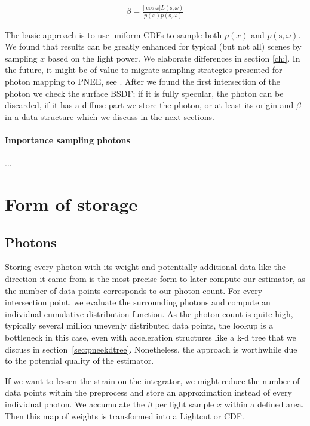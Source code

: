 \begin{align}\label{eq:beta}
\beta = \frac{|\cos{\omega}|L(\text{s}, \omega)}{p(x)p(\text{s}, \omega)}
\end{align}

The basic approach is to use uniform CDFs to sample both $p(x)$ and $p(\text{s}, \omega)$. We found that results can be greatly enhanced for typical (but not all) scenes by sampling $x$ based on the light power. We elaborate differences in section \ref{ch:}. In the future, it might be of value to migrate sampling strategies presented for photon mapping to PNEE, see \cite{DBLP:conf/rt/SuykensW00}. After we found the first intersection of the photon we check the surface BSDF; if it is fully specular, the photon can be discarded, if it has a diffuse part we store the photon, or at least its origin and $\beta$ in a data structure which we discuss in the next sections.

\paragraph*{Importance sampling photons}
\label{ch:photonimportancesample}
...

\section{Form of storage}
\label{ch:formofstorage}

\subsection{Photons}

Storing every photon with its weight and potentially additional data like the direction it came from is the most precise form to later compute our estimator, as the number of data points corresponds to our photon count. For every intersection point, we evaluate the surrounding photons and compute an individual cumulative distribution function. As the photon count is quite high, typically several million unevenly distributed data points, the lookup is a bottleneck in this case, even with acceleration structures like a k-d tree that we discuss in section~\ref{sec:pneekdtree}. Nonetheless, the approach is worthwhile due to the potential quality of the estimator.

If we want to lessen the strain on the integrator, we might reduce the number of data points within the preprocess and store an approximation instead of every individual photon. We accumulate the $\beta$ per light sample $x$ within a defined area. Then this map of weights is transformed into a Lightcut or CDF.


